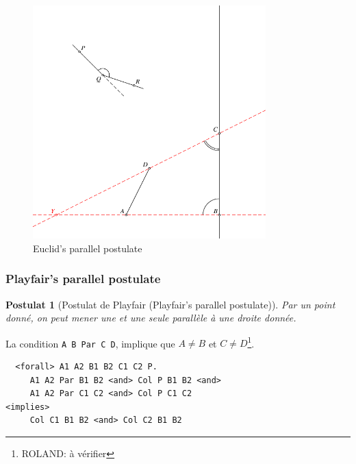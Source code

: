 \documentclass[8pt,a4paper]{article}
\theoremstyle{plain}
\newtheorem{postulat}{Postulat}
\begin{document}
  \begin{figure}[H] %
  \centering
    \includegraphics[width=90mm]{fig04.pdf}
    \caption{Euclid's parallel postulate\label{EuclidParallelPostulate}}
  \end{figure}

\subsubsection{Playfair's parallel postulate}
\begin{postulat}[Postulat de Playfair (Playfair's parallel postulate)]
  Par un point donné, on peut mener une et une seule parallèle à une droite donnée.
\end{postulat}
La condition \verb+A B Par C D+, implique que $A \neq B$ et $C\neq D$\footnote{ROLAND: à vérifier}.
  \begin{tcolorbox}
\begin{verbatim}
  <forall> A1 A2 B1 B2 C1 C2 P.
     A1 A2 Par B1 B2 <and> Col P B1 B2 <and> 
     A1 A2 Par C1 C2 <and> Col P C1 C2 
<implies>
     Col C1 B1 B2 <and> Col C2 B1 B2
\end{verbatim}
  \end{tcolorbox}
\end{document}
